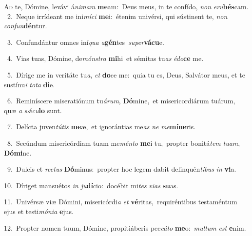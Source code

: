 \lettrine{\initial\textcolor{\initialcolor}{A}}{d} te, Dómine, levávi á\-\textit{ni}\-\textit{mam} \textbf{me}\-am:~\star Deus meus, in te confído, \textit{non} \textit{e}\-\textit{ru}\textbf{bés}cam.\\
{\numbfont\textcolor{\numbcolor}{~2.}}~Neque irrídeant me ini\-\textit{mí}\-\textit{ci} \textbf{me}\-i:~\star étenim univérsi, qui sústinent te, \textit{non} \textit{con}\-\textit{fun}\textbf{dén}tur.\par
{\numbfont\textcolor{\numbcolor}{~3.}}~Confundántur omnes iní\textit{qua} \textit{a}\-\textbf{gén}tes~\star \textit{su}\-\textit{per}\textbf{vá}\textbf{cu}e.\par
{\numbfont\textcolor{\numbcolor}{~4.}}~Vias tuas, Dómine, de\-\textit{móns}\-\textit{tra} \textbf{mi}\-hi~\star et sémitas tu\textit{as} \textit{é}\-\textit{do}\textbf{ce} me.\par
{\numbfont\textcolor{\numbcolor}{~5.}}~Dírige me in veritáte tu\-\textit{a}\-, \textit{et} \textbf{do}\-ce me:~\star quia tu es, Deus, Salvátor meus, et te sustínu\textit{i} \textit{to}\-\textit{ta} \textbf{di}\-e.\par
{\numbfont\textcolor{\numbcolor}{~6.}}~Reminíscere miseratiónum tu\-\textit{á}\-\textit{rum}, \textbf{Dó}\-mine,~\star et misericordiárum tuárum, quæ \textit{a} \textit{sǽ}\-\textit{cu}\textbf{lo} sunt.\par
{\numbfont\textcolor{\numbcolor}{~7.}}~Delícta juven\-\textit{tú}\-\textit{tis} \textbf{me}\-æ,~\star et ignorántias me\textit{as} \textit{ne} \textit{me}\-\textbf{mí}\textbf{ne}ris.\par
{\numbfont\textcolor{\numbcolor}{~8.}}~Secúndum misericórdiam tuam me\-\textit{mén}\-\textit{to} \textbf{me}\-i tu,~\star propter bonitá\textit{tem} \textit{tu}\-\textit{am}, \textbf{Dó}\-\textbf{mi}ne.\par
{\numbfont\textcolor{\numbcolor}{~9.}}~Dulcis et \textit{rec}\-\textit{tus} \textbf{Dó}\-minus:~\star propter hoc legem dabit delinquén\-\textit{ti}\-\textit{bus} \textit{in} \textbf{vi}\-a.\par
{\numbfont\textcolor{\numbcolor}{10.}}~Díriget mansuétos \textit{in} \textit{ju}\-\textbf{dí}cio:~\star docébit mi\textit{tes} \textit{vi}\-\textit{as} \textbf{su}\-as.\par
{\numbfont\textcolor{\numbcolor}{11.}}~Univérsæ viæ Dómini, misericórdi\textit{a} \textit{et} \textbf{vé}\-ritas,~\star requiréntibus testaméntum ejus et testi\-\textit{mó}\-\textit{ni}\textit{a} \textbf{e}\-jus.\par
{\numbfont\textcolor{\numbcolor}{12.}}~Propter nomen tuum, Dómine, propitiáberis pec\-\textit{cá}\-\textit{to} \textbf{me}\-o:~\star \textit{mul}\-\textit{tum} \textit{est} \textbf{e}\-nim.\par
